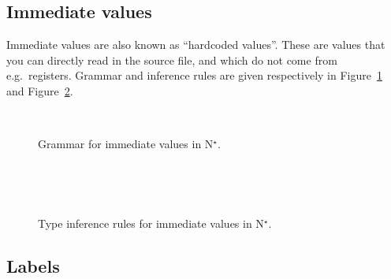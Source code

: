 \subsection{Immediate values}\label{subsec:nstar-common-expressions-immediate}

Immediate values are also known as ``hardcoded values''.
These are values that you can directly read in the source file, and which do not come from e.g.\ registers.
Grammar and inference rules are given respectively in Figure~\ref{fig:nstar-common-expressions-immediate-grammar} and Figure~\ref{fig:nstar-common-expressions-immediate-typerules}.

\begin{figure}[H]
  \centering
  \\
  \caption{Grammar for immediate values in N$^\star$.}
  \label{fig:nstar-common-expressions-immediate-grammar}
\end{figure}

\begin{figure}[H]
  \centering

  \begin{prooftree}
  \end{prooftree}
  \\\vspace{\baselineskip}
  \begin{prooftree}
  \end{prooftree}
  \\\vspace{\baselineskip}
  \begin{prooftree}
  \end{prooftree}

  \caption{Type inference rules for immediate values in N$^\star$.}
  \label{fig:nstar-common-expressions-immediate-typerules}
\end{figure}

\subsection{Labels}\label{subsec:nstar-common-expressions-labels}

